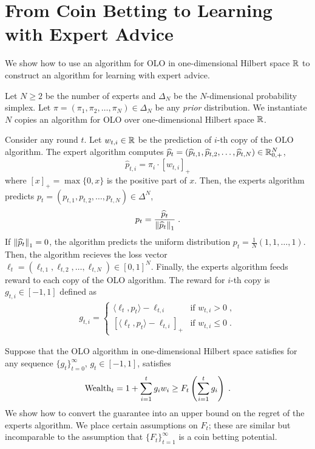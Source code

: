 \section{From Coin Betting to Learning with Expert Advice}
\label{section:reduction-experts}

We show how to use an algorithm for OLO in one-dimensional Hilbert space $\mathbb{R}$
to construct an algorithm for learning with expert advice.

Let $N \ge 2$ be the number of experts and $\Delta_N$ be the $N$-dimensional
probability simplex. Let $\pi = (\pi_1, \pi_2, \dots, \pi_N) \in \Delta_N$ be any
\emph{prior} distribution. We instantiate $N$ copies an algorithm for OLO over
one-dimensional Hilbert space $\mathbb{R}$.

Consider any round $t$. Let $w_{t,i} \in \mathbb{R}$ be the prediction of $i$-th copy of
the OLO algorithm. The expert algorithm computes $\widehat p_t = (\widehat
p_{t,1}, \widehat p_{t,2}, \dots, \widehat p_{t,N}) \in \mathbb{R}_{0,+}^N$,
$$
\widehat p_{t,i} = \pi_i \cdot [w_{t,i}]_+
$$
where $[x]_+ = \max\{0,x\}$ is the positive part of $x$. Then, the experts
algorithm predicts $p_t = (p_{t,1}, p_{t,2}, \dots, p_{t,N}) \in \Delta^N$,
$$
p_t = \frac{\widehat p_t}{\left\|{\widehat p_t}\right\|_1} \; .
$$
If $\left\|{\widehat p_t}\right\|_1 = 0$, the algorithm predicts the uniform distribution
$p_t = \frac{1}{N}(1,1,\dots,1)$. Then, the algorithm recieves the loss vector
$\ell_t = (\ell_{t,1}, \ell_{t,2}, \dots, \ell_{t,N}) \in [0,1]^N$. Finally, the
experts algorithm feeds reward to each copy of the OLO algorithm. The reward for
$i$-th copy is $g_{t,i} \in [-1,1]$ defined as
\begin{align}
g_{t,i} =
\begin{cases}
\langle \ell_t, p_t \rangle - \ell_{t,i} & \text{if } w_{t,i} > 0 \; , \\
\left[\langle \ell_t, p_t \rangle - \ell_{t,i} \right]_+ & \text{if } w_{t,i} \le 0 \; .
\end{cases}
\end{align}

Suppose that the OLO algorithm in one-dimensional Hilbert space
satisfies for any sequence $\{g_t\}_{t=0}^\infty$, $g_t \in [-1,1]$, satisfies
\begin{equation}
\label{equation:experts-one-dimensional-assumption}
\operatorname{Wealth}_t = 1 + \sum_{i=1}^t g_i w_i \ge F_t\left(\sum_{i=1}^t g_i\right) \; .
\end{equation}
We show how to convert the guarantee into an upper bound on the regret of the
experts algorithm. We place certain assumptions on $F_t$; these are similar but
incomparable to the assumption that $\{F_t\}_{t=1}^\infty$
is a coin betting potential.

